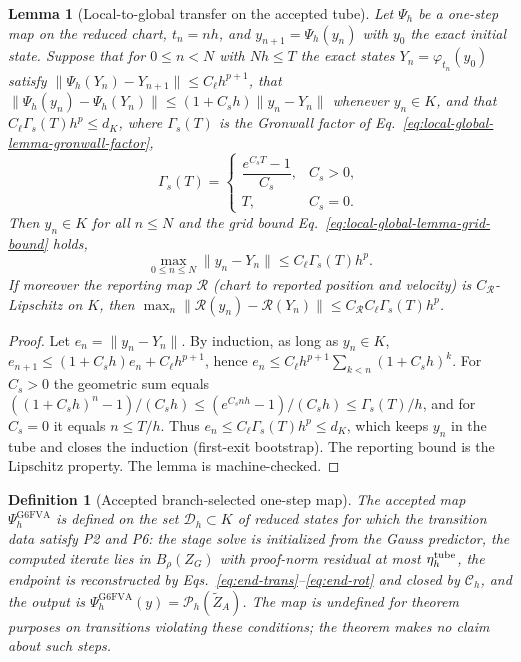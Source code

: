 \documentclass[preprint,12pt]{elsarticle}
\newtheorem{definition}{Definition}
\newtheorem{lemma}{Lemma}
\begin{document}
\begin{lemma}[Local-to-global transfer on the accepted tube]
\label{lem:local-global-transfer}
Let $\Psi_h$ be a one-step map on the reduced chart, $t_n=nh$, and
$y_{n+1}=\Psi_h(y_n)$ with $y_0$ the exact initial state. Suppose that for
$0\le n<N$ with $Nh\le T$ the exact states $Y_n=\varphi_{t_n}(y_0)$ satisfy
$\|\Psi_h(Y_n)-Y_{n+1}\|\le C_\ell h^{p+1}$, that
$\|\Psi_h(y_n)-\Psi_h(Y_n)\|\le(1+C_sh)\|y_n-Y_n\|$ whenever $y_n\in K$,
and that $C_\ell\Gamma_s(T)h^p\le d_K$, where $\Gamma_s(T)$ is the Gronwall
factor of Eq.~\eqref{eq:local-global-lemma-gronwall-factor},
\begin{equation}
\label{eq:local-global-lemma-gronwall-factor}
  \Gamma_s(T)=
  \begin{cases}
    \dfrac{e^{C_sT}-1}{C_s}, & C_s>0,\\[0.6em]
    T, & C_s=0 .
  \end{cases}
\end{equation}
Then $y_n\in K$ for all $n\le N$ and the grid bound
Eq.~\eqref{eq:local-global-lemma-grid-bound} holds,
\begin{equation}
\label{eq:local-global-lemma-grid-bound}
  \max_{0\le n\le N}\|y_n-Y_n\|\le C_\ell\Gamma_s(T)h^p .
\end{equation}
If moreover the reporting map $\mathcal R$ (chart to reported position and
velocity) is $C_{\mathcal R}$-Lipschitz on $K$, then
$\max_n\|\mathcal R(y_n)-\mathcal R(Y_n)\|\le
C_{\mathcal R}C_\ell\Gamma_s(T)h^p$.
\end{lemma}

\begin{proof}
Let $e_n=\|y_n-Y_n\|$. By induction, as long as $y_n\in K$,
$e_{n+1}\le(1+C_sh)e_n+C_\ell h^{p+1}$, hence
$e_n\le C_\ell h^{p+1}\sum_{k<n}(1+C_sh)^k$. For $C_s>0$ the geometric sum
equals $((1+C_sh)^n-1)/(C_sh)\le(e^{C_snh}-1)/(C_sh)\le\Gamma_s(T)/h$, and
for $C_s=0$ it equals $n\le T/h$. Thus $e_n\le C_\ell\Gamma_s(T)h^p\le d_K$,
which keeps $y_n$ in the tube and closes the induction (first-exit
bootstrap). The reporting bound is the Lipschitz property. The lemma is
machine-checked.
\end{proof}

\begin{definition}[Accepted branch-selected one-step map]
\label{def:accepted-branch-map}
The accepted map $\Psi_h^{\mathrm{G6FVA}}$ is defined on the set
$\mathcal D_h\subset K$ of reduced states for which the transition data
satisfy P2 and P6: the stage solve is initialized from the Gauss predictor,
the computed iterate lies in $B_\rho(Z_G)$ with proof-norm residual at most
$\eta_h^{\rm tube}$, the endpoint is reconstructed by
Eqs.~\eqref{eq:end-trans}--\eqref{eq:end-rot} and closed by $\mathcal C_h$,
and the output is $\Psi_h^{\mathrm{G6FVA}}(y)=\mathcal P_h(\widetilde Z_A)$.
The map is undefined for theorem purposes on transitions violating these
conditions; the theorem makes no claim about such steps.
\end{definition}
\end{document}

